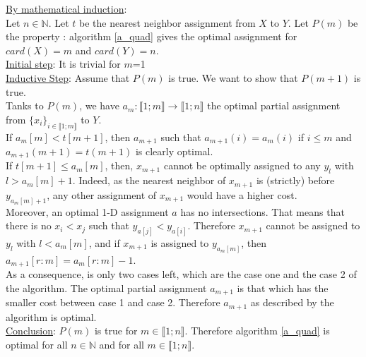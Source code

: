 \documentclass[a4paper,12pt]{article}
\begin{document}
\noindent \underline{By mathematical induction}:\\
Let $n \in \mathbb{N}$.
Let $t$ be the nearest neighbor assignment from $X$ to $Y$.
Let $P(m)$ be the property : algorithm \ref{a_quad} gives the optimal assignment for $card(X)=m$ and $card(Y)=n$.\\
\noindent \underline{Initial step}: It is trivial for $m$=1 \\
\noindent \underline{Inductive Step}: Assume that $P(m)$ is true. We want to show that $P(m+1)$ is true. \\
\noindent Tanks to $P(m)$, we have $a_m : \llbracket 1;m \rrbracket \rightarrow \llbracket 1;n \rrbracket$ the optimal partial assignment from $\{x_i\}_{i \in \llbracket 1;m \rrbracket}$ to $Y$.\\
\noindent If $a_m[m] < t[m+1]$, then $a_{m+1}$ such that $a_{m+1}(i)=a_m(i)$ if $i \leqslant m$ and $a_{m+1}(m+1)=t(m+1)$ is clearly optimal.\\
\noindent
\noindent If $t[m+1] \leqslant a_m[m]$, then, $x_{m+1}$ cannot be optimally assigned to any $y_l$ with $l>a_m[m]+1$. Indeed, as the nearest neighbor of $x_{m+1}$ is (strictly) before $y_{a_m[m]+1}$, any other assignment of $x_{m+1}$ would have a higher cost. \\
\noindent Moreover, an optimal 1-D assignment $a$ has no intersections. That means that there is no $x_i < x_j$ such that $y_{a[j]} < y_{a[i]}$. Therefore $x_{m+1}$  cannot be assigned to $y_l$ with $l<a_m[m]$, and if $x_{m+1}$ is assigned to $y_{a_m[m]}$, then $a_{m+1}[r:m] = a_{m}[r:m]-1$.\\
\noindent As a consequence, is only two cases left, which are the case one and the case 2 of the algorithm. The optimal partial assignment $a_{m+1}$ is that which has the smaller cost between case 1 and case 2.
\noindent Therefore $a_{m+1}$ as described by the algorithm is optimal.\\
\noindent \underline{Conclusion}: $P(m)$ is true for $m \in \llbracket 1;n \rrbracket$. Therefore algorithm \ref{a_quad} is optimal for all $n \in \mathbb{N}$ and for all $m \in \llbracket 1;n \rrbracket$.

\bigskip





\end{document}
